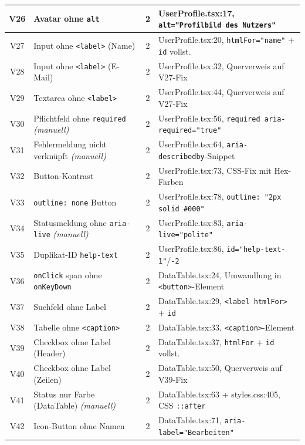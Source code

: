 \begin{longtable}{|c|p{5.2cm}|c|p{5.8cm}|}
V26 & Avatar ohne \texttt{alt}                     & 2 & UserProfile.tsx:17, \texttt{alt="Profilbild des Nutzers"} \\
\hline
V27 & Input ohne \texttt{<label>} (Name)           & 2 & UserProfile.tsx:20, \texttt{htmlFor="name"} + \texttt{id} vollst. \\
\hline
V28 & Input ohne \texttt{<label>} (E-Mail)         & 2 & UserProfile.tsx:32, Querverweis auf V27-Fix \\
\hline
V29 & Textarea ohne \texttt{<label>}               & 2 & UserProfile.tsx:44, Querverweis auf V27-Fix \\
\hline
V30 & Pflichtfeld ohne \texttt{required} \textit{(manuell)} & 2 & UserProfile.tsx:56, \texttt{required aria-required="true"} \\
\hline
V31 & Fehlermeldung nicht verknüpft \textit{(manuell)} & 2 & UserProfile.tsx:64, \texttt{aria-describedby}-Snippet \\
\hline
V32 & Button-Kontrast                              & 2 & UserProfile.tsx:73, CSS-Fix mit Hex-Farben \\
\hline
V33 & \texttt{outline: none} Button                & 2 & UserProfile.tsx:78, \texttt{outline: "2px solid \#000"} \\
\hline
V34 & Statusmeldung ohne \texttt{aria-live} \textit{(manuell)} & 2 & UserProfile.tsx:83, \texttt{aria-live="polite"} \\
\hline
V35 & Duplikat-ID \texttt{help-text}               & 2 & UserProfile.tsx:86, \texttt{id="help-text-1"}/\texttt{-2} \\
\hline
V36 & \texttt{onClick} span ohne \texttt{onKeyDown}& 2 & DataTable.tsx:24, Umwandlung in \texttt{<button>}-Element \\
\hline
V37 & Suchfeld ohne Label                          & 2 & DataTable.tsx:29, \texttt{<label htmlFor>} + \texttt{id} \\
\hline
V38 & Tabelle ohne \texttt{<caption>}              & 2 & DataTable.tsx:33, \texttt{<caption>}-Element \\
\hline
V39 & Checkbox ohne Label (Header)                 & 2 & DataTable.tsx:37, \texttt{htmlFor} + \texttt{id} vollst. \\
\hline
V40 & Checkbox ohne Label (Zeilen)                 & 2 & DataTable.tsx:50, Querverweis auf V39-Fix \\
\hline
V41 & Status nur Farbe (DataTable) \textit{(manuell)} & 2 & DataTable.tsx:63 + styles.css:405, CSS \texttt{::after} \\
\hline
V42 & Icon-Button ohne Namen                       & 2 & DataTable.tsx:71, \texttt{aria-label="Bearbeiten"} \\

\end{longtable}
